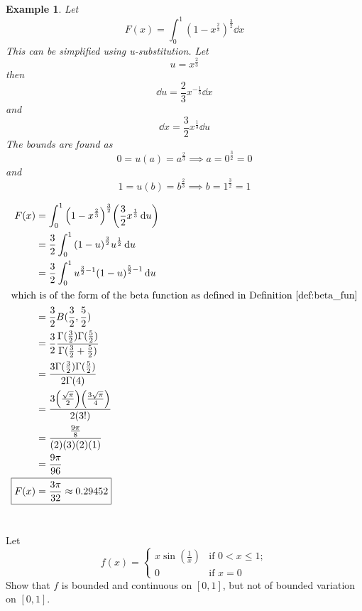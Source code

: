 \documentclass[]{article}
\newtheorem{example}{Example}
\begin{document}
\begin{example}
    Let \[
        F(x) = \int_{0}^{1} (1-x^{\frac{2}{3}})^{\frac{3}{2}} \dd{x}
    \] This can be simplified using u-substitution.
    Let \[
        u = x^{\frac{2}{3}}
    \] then \[
        \dd{u} = \frac{2}{3} x^{-\frac{1}{3}} \dd{x}
    \] and \[
        \dd{x} = \frac{3}{2} x^{\frac{1}{3}} \dd{u}
    \]
    The bounds are found as \[
        0 = u(a) = a^{\frac{2}{3}} \implies a = 0^{\frac{3}{2}} = 0
    \] and \[
        1 = u(b) = b^{\frac{2}{3}} \implies b = 1^{\frac{3}{2}} = 1
    \]
    
    \begin{align*}
        F(x) 
            &= \int_{0}^{1} \qty(1 - x^{\frac{2}{3}} )^{\frac{3}{2}} 
                        \qty(\frac{3}{2} x^{\frac{1}{3}} \dd{u})\\
            &= \frac{3}{2} \int_{0}^{1} \qty(1 - u)^{\frac{3}{2}} u^{\frac{1}{2}} \dd{u}\\
            &= \frac{3}{2} \int_{0}^{1} u^{\frac{3}{2}-1} \qty(1 - u)^{\frac{5}{2}-1}  \dd{u}\\
        \intertext{which is of the form of the beta function as defined in Definition \ref{def:beta_fun}}
            &= \frac{3}{2} B(\frac{3}{2}, \frac{5}{2})\\
            &= \frac{3}{2} \cfrac{
                                        \Gamma(\frac{3}{2})\Gamma(\frac{5}{2})
                                    }{
                                        \Gamma(\frac{3}{2} + \frac{5}{2})
                                    }\\
            &= \cfrac{
                3 \Gamma(\frac{3}{2})\Gamma(\frac{5}{2})
            }{
                2 \Gamma(4)
            }\\
            &= \cfrac{
                3 \qty(\frac{\sqrt{\pi}}{2}) \qty(\frac{3\sqrt{\pi}}{4})
            }{
                2 \qty(3!)
            }\\
            &= \cfrac{
                \frac{9 \pi}{8}
            }{
                (2)(3)(2)(1)
            }\\
            &= \frac{9 \pi}{96}\\
        \Aboxed{
            F(x) &= \frac{3 \pi}{32} \approx 0.29452
        }
    \end{align*}

\end{example}


\newpage
\section{}
Let \[
    f(x) = \begin{cases}
        x \sin(\frac{1}{x}) &\text{if } 0<x \leq 1;\\
        0 &\text{if } x = 0
    \end{cases}
\] Show that $f$ is bounded and continuous on $[0,1]$, but not of bounded variation on $[0,1]$.
\end{document}
